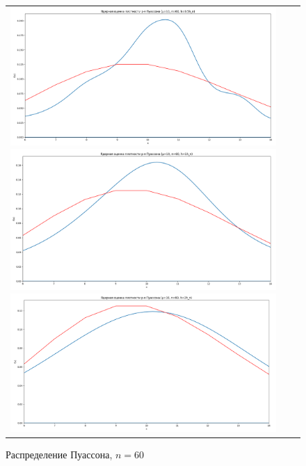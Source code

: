 \begin{figure}[H]
	\begin{tabular}{ccc}
		\includegraphics[scale=0.14]{resources/4_poisson_60_half.png}
		\includegraphics[scale=0.14]{resources/4_poisson_60_one.png}
		\includegraphics[scale=0.14]{resources/4_poisson_60_two.png}
	\end{tabular}
	\caption{Распределение Пуассона, $n=60$}
\end{figure}

